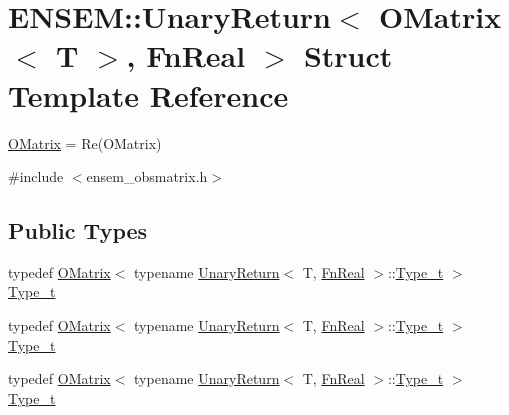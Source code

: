 \hypertarget{structENSEM_1_1UnaryReturn_3_01OMatrix_3_01T_01_4_00_01FnReal_01_4}{}\section{E\+N\+S\+EM\+:\+:Unary\+Return$<$ O\+Matrix$<$ T $>$, Fn\+Real $>$ Struct Template Reference}
\label{structENSEM_1_1UnaryReturn_3_01OMatrix_3_01T_01_4_00_01FnReal_01_4}


\mbox{\hyperlink{classENSEM_1_1OMatrix}{O\+Matrix}} = Re(\+O\+Matrix)  




{\ttfamily \#include $<$ensem\+\_\+obsmatrix.\+h$>$}

\subsection*{Public Types}
\begin{DoxyCompactItemize}
\item 
typedef \mbox{\hyperlink{classENSEM_1_1OMatrix}{O\+Matrix}}$<$ typename \mbox{\hyperlink{structENSEM_1_1UnaryReturn}{Unary\+Return}}$<$ T, \mbox{\hyperlink{structENSEM_1_1FnReal}{Fn\+Real}} $>$\+::\mbox{\hyperlink{structENSEM_1_1UnaryReturn_3_01OMatrix_3_01T_01_4_00_01FnReal_01_4_a060b381191f238b0c1dc9189a3a14c6d}{Type\+\_\+t}} $>$ \mbox{\hyperlink{structENSEM_1_1UnaryReturn_3_01OMatrix_3_01T_01_4_00_01FnReal_01_4_a060b381191f238b0c1dc9189a3a14c6d}{Type\+\_\+t}}
\item 
typedef \mbox{\hyperlink{classENSEM_1_1OMatrix}{O\+Matrix}}$<$ typename \mbox{\hyperlink{structENSEM_1_1UnaryReturn}{Unary\+Return}}$<$ T, \mbox{\hyperlink{structENSEM_1_1FnReal}{Fn\+Real}} $>$\+::\mbox{\hyperlink{structENSEM_1_1UnaryReturn_3_01OMatrix_3_01T_01_4_00_01FnReal_01_4_a060b381191f238b0c1dc9189a3a14c6d}{Type\+\_\+t}} $>$ \mbox{\hyperlink{structENSEM_1_1UnaryReturn_3_01OMatrix_3_01T_01_4_00_01FnReal_01_4_a060b381191f238b0c1dc9189a3a14c6d}{Type\+\_\+t}}
\item 
typedef \mbox{\hyperlink{classENSEM_1_1OMatrix}{O\+Matrix}}$<$ typename \mbox{\hyperlink{structENSEM_1_1UnaryReturn}{Unary\+Return}}$<$ T, \mbox{\hyperlink{structENSEM_1_1FnReal}{Fn\+Real}} $>$\+::\mbox{\hyperlink{structENSEM_1_1UnaryReturn_3_01OMatrix_3_01T_01_4_00_01FnReal_01_4_a060b381191f238b0c1dc9189a3a14c6d}{Type\+\_\+t}} $>$ \mbox{\hyperlink{structENSEM_1_1UnaryReturn_3_01OMatrix_3_01T_01_4_00_01FnReal_01_4_a060b381191f238b0c1dc9189a3a14c6d}{Type\+\_\+t}}
\end{DoxyCompactItemize}


